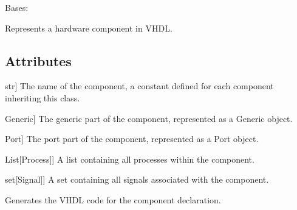 \documentclass[letterpaper,10pt,english]{sphinxmanual}
\begin{document}
\begin{fulllineitems}
\label{\detokenize{component:component.Component}}
\pysigstartsignatures
{}
\pysigstopsignatures
\sphinxAtStartPar
Bases: 

\sphinxAtStartPar
Represents a hardware component in VHDL.


\subsection{Attributes}
\label{\detokenize{component:attributes}}\begin{description}
\sphinxlineitem{name}{[}str{]}
\sphinxAtStartPar
The name of the component, a constant defined for each component inheriting this class.

\sphinxlineitem{generic}{[}Generic{]}
\sphinxAtStartPar
The generic part of the component, represented as a Generic object.

\sphinxlineitem{ports}{[}Port{]}
\sphinxAtStartPar
The port part of the component, represented as a Port object.

\sphinxlineitem{process\_list}{[}List{[}Process{]}{]}
\sphinxAtStartPar
A list containing all processes within the component.

\sphinxlineitem{signals\_list}{[}set{[}Signal{]}{]}
\sphinxAtStartPar
A set containing all signals associated with the component.

\end{description}

\begin{fulllineitems}
\label{\detokenize{component:component.Component.component_code}}
\pysigstartsignatures
{}
\pysigstopsignatures
\sphinxAtStartPar
Generates the VHDL code for the component declaration.



\end{fulllineitems}
\end{fulllineitems}
\end{document}
